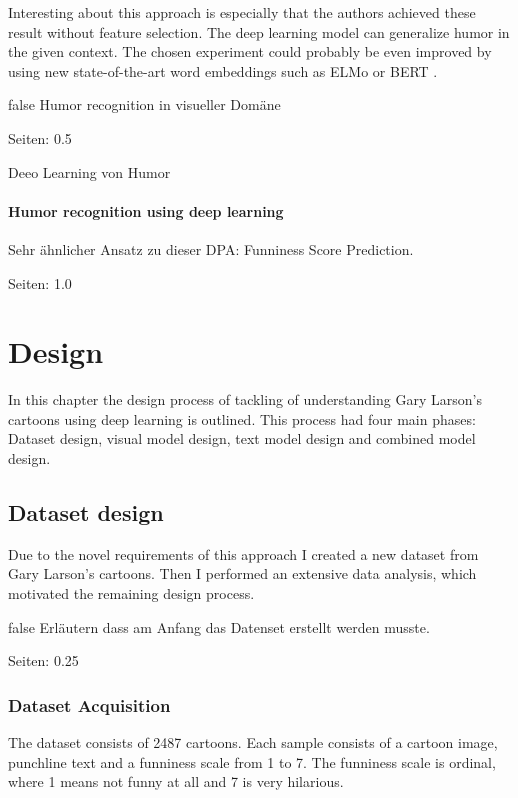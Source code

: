 \documentclass[draft,final,oneside]{vutinfth} %
\begin{document}
Interesting about this approach is especially that the authors achieved these result without feature selection. The deep learning model can generalize humor in the given context. The chosen experiment could probably be even improved by using new state-of-the-art word embeddings such as ELMo or BERT \cite{elmo}\cite{bert}.

\if false
Humor recognition in visueller Domäne

\cite{chen2017convolutional}

Seiten: 0.5


Deeo Learning von Humor 

\cite{chen2018humor}



\subsubsection{Humor recognition using deep learning}

Sehr ähnlicher Ansatz zu dieser DPA: Funniness Score Prediction.

\cite{chiruzzo2019overview}

Seiten: 1.0
\fi

\chapter{Design} \label{design}

In this chapter the design process of tackling of understanding Gary Larson's cartoons using deep learning is outlined. This process had four main phases: Dataset design, visual model design, text model design and combined model design.

\section{Dataset design}

Due to the novel requirements of this approach I created a new dataset from Gary Larson's cartoons. Then I performed an extensive data analysis, which motivated the remaining design process.

\if false
Erläutern dass am Anfang das Datenset erstellt werden musste.

Seiten: 0.25
\fi

\subsection{Dataset Acquisition}
The dataset consists of 2487 cartoons. Each sample consists of a cartoon image, punchline text and a funniness scale from 1 to 7. The funniness scale is ordinal, where 1 means not funny at all and 7 is very hilarious.
\end{document}

